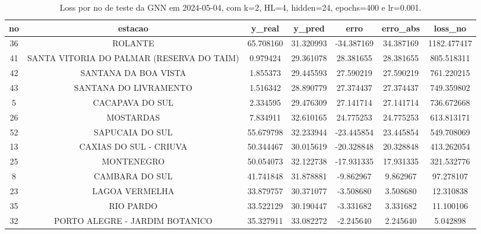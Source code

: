 \begin{table}[h]
\centering
\caption{Loss por no de teste da GNN em 2024-05-04, com k=2, HL=4, hidden=24, epochs=400 e lr=0.001.}
\label{tab:gnn_loss_k2_hl4_h24_e400_d20240504}
\begin{tabular}{ccccccc}
\toprule
no & estacao & y\_real & y\_pred & erro & erro\_abs & loss\_no \\
\midrule
36 & ROLANTE & 65.708160 & 31.320993 & -34.387169 & 34.387169 & 1182.477417 \\
41 & SANTA VITORIA DO PALMAR (RESERVA DO TAIM) & 0.979424 & 29.361078 & 28.381655 & 28.381655 & 805.518311 \\
42 & SANTANA DA BOA VISTA & 1.855373 & 29.445593 & 27.590219 & 27.590219 & 761.220215 \\
43 & SANTANA DO LIVRAMENTO & 1.516342 & 28.890779 & 27.374437 & 27.374437 & 749.359802 \\
5 & CACAPAVA DO SUL & 2.334595 & 29.476309 & 27.141714 & 27.141714 & 736.672668 \\
26 & MOSTARDAS & 7.834911 & 32.610165 & 24.775253 & 24.775253 & 613.813171 \\
52 & SAPUCAIA DO SUL & 55.679798 & 32.233944 & -23.445854 & 23.445854 & 549.708069 \\
13 & CAXIAS DO SUL - CRIUVA & 50.344467 & 30.015619 & -20.328848 & 20.328848 & 413.262054 \\
25 & MONTENEGRO & 50.054073 & 32.122738 & -17.931335 & 17.931335 & 321.532776 \\
8 & CAMBARA DO SUL & 41.741848 & 31.878881 & -9.862967 & 9.862967 & 97.278107 \\
23 & LAGOA VERMELHA & 33.879757 & 30.371077 & -3.508680 & 3.508680 & 12.310838 \\
35 & RIO PARDO & 33.522129 & 30.190447 & -3.331682 & 3.331682 & 11.100106 \\
32 & PORTO ALEGRE - JARDIM BOTANICO & 35.327911 & 33.082272 & -2.245640 & 2.245640 & 5.042898 \\
\bottomrule
\end{tabular}
\end{table}
